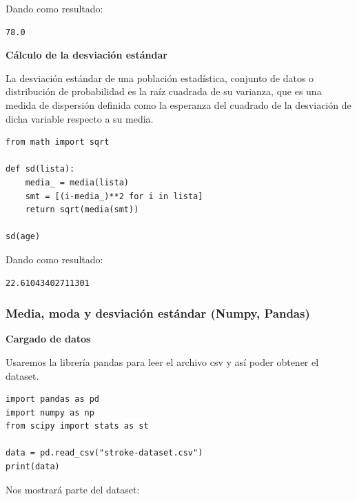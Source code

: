 \documentclass[letter]{article}
\begin{document}
Dando como resultado:

\begin{verbatim}
78.0
\end{verbatim}

\textbf{Cálculo de la desviación estándar}

La desviación estándar de una población estadística, conjunto de datos o
distribución de probabilidad es la raíz cuadrada de su varianza, que es una
medida de dispersión definida como la esperanza del cuadrado de la desviación de
dicha variable respecto a su media.

\begin{verbatim}
from math import sqrt

def sd(lista):
    media_ = media(lista)
    smt = [(i-media_)**2 for i in lista]
    return sqrt(media(smt))

sd(age)
\end{verbatim}

Dando como resultado:

\begin{verbatim}
22.61043402711301
\end{verbatim}

\subsubsection{Media, moda y desviación estándar (Numpy, Pandas)}
\label{sec:orgfea8baa}

\textbf{Cargado de datos}

Usaremos la librería pandas para leer el archivo csv y así poder obtener el dataset.

\begin{verbatim}
import pandas as pd
import numpy as np
from scipy import stats as st

data = pd.read_csv("stroke-dataset.csv")
print(data)
\end{verbatim}

Nos mostrará parte del dataset:
\end{document}
